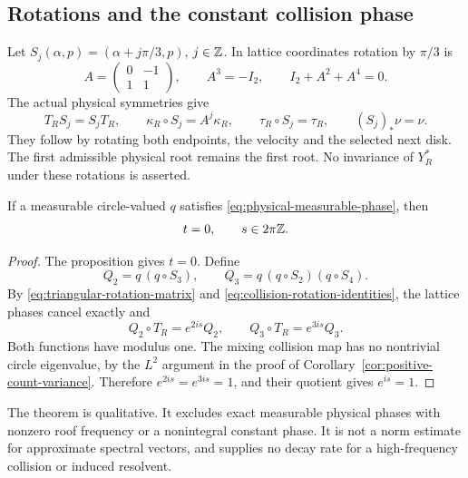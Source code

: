 \subsection{Rotations and the constant collision phase}
Let $S_j(\alpha,p)=(\alpha+j\pi/3,p)$, $j\in\mathbb Z$. In lattice
coordinates rotation by $\pi/3$ is
\begin{equation}\label{eq:triangular-rotation-matrix}
 A=\begin{pmatrix}0&-1\\1&1\end{pmatrix},\qquad
 A^3=-I_2,\qquad I_2+A^2+A^4=0.
\end{equation}
The actual physical symmetries give
\begin{equation}\label{eq:collision-rotation-identities}
 T_RS_j=S_jT_R,\qquad
 \kappa_R\circ S_j=A^j\kappa_R,\qquad
 \tau_R\circ S_j=\tau_R,\qquad (S_j)_*\nu=\nu.
\end{equation}
They follow by rotating both endpoints, the velocity and the selected
next disk. The first admissible physical root remains the first root.
No invariance of $Y_R^*$ under these rotations is asserted.

\begin{theorem}
\label{thm:physical-phase-rigidity}
If a measurable circle-valued $q$ satisfies
\eqref{eq:physical-measurable-phase}, then
\begin{equation}\label{eq:physical-phase-conclusion}
 t=0,\qquad s\in2\pi\mathbb Z.
\end{equation}
\end{theorem}
\begin{proof}
The proposition gives $t=0$. Define
\[
 Q_2=q\,(q\circ S_3),\qquad
 Q_3=q\,(q\circ S_2)(q\circ S_4).
\]
By \eqref{eq:triangular-rotation-matrix} and
\eqref{eq:collision-rotation-identities}, the lattice phases cancel
exactly and
\[
 Q_2\circ T_R=e^{2is}Q_2,\qquad Q_3\circ T_R=e^{3is}Q_3.
\]
Both functions have modulus one. The mixing collision map has no
nontrivial circle eigenvalue, by the $L^2$ argument in the proof of
Corollary~\ref{cor:positive-count-variance}. Therefore
$e^{2is}=e^{3is}=1$, and their quotient gives $e^{is}=1$.
\end{proof}

The theorem is qualitative. It excludes exact measurable physical
phases with nonzero roof frequency or a nonintegral constant phase.
It is not a norm estimate for approximate spectral vectors, and supplies
no decay rate for a high-frequency collision or induced resolvent.
